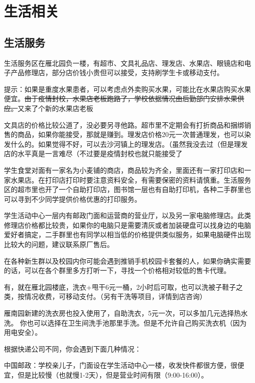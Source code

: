 \section{生活相关}

\subsection*{生活服务}


生活服务区在雁北园负一楼，有超市、文具礼品店、理发店、水果店、眼镜店和电子产品修理店，部分店价钱小贵但可以接受，支持刷学生卡或移动支付。

提示：如果是重度水果患者，可以考虑点外卖购买水果，可能比在水果店购买水果便宜。\sout{由于疫情封校，水果店老板跑路了，学校依据情况由后勤部门安排水果供应。}又来了个新的水果店老板

文具店的价格比较公道了，没必要另寻他路。超市里不定期会有打折商品和捆绑销售的商品，如果你能接受，那就是赚到。理发店价格20元一次普通理发，也可以染发什么的。如果觉得不好，可以去沙河镇上的理发店。（虽然我没去过（但是理发店的水平真是一言难尽（不过要是疫情封校也就只能接受了

学生食堂对面有一家名为小麦铺的商店，商品较为齐全，里面还有一家打印店和一家水果店。在打印店打印时要注意资料安全，有需要保密的资料请慎重。生活服务区的超市里也开了一个自助打印店，图书馆一层也有自助打印机，各种二手群里也可以寻到不少同学提供价格优惠的打印服务。

学生活动中心一层内有邮政门面和运营商的营业厅，以及另一家电脑修理店。此类修理店价格都比较贵，如果你的电脑只是需要清灰或者加装硬盘可以找身边的电脑爱好者搞定，二手群里也有同学以相当低的价格提供类似服务，如果电脑硬件出现比较大的问题，建议联系原厂售后。

在各种新生群以及校园内你可能会遇到推销手机校园卡套餐的人，如果你确实需要的话，可以在各个群里多方打听一下，寻找一个价格相对较低的售卡代理。


有，就在雁北园楼底，洗衣+甩干6元一桶，2小时后可取，也可以洗被子鞋子之类，按情况收费，可移动支付。（另有干洗等项目，详情到店咨询）

雁南园新建的洗衣房也投入使用了，自助洗衣，5元一次，可以多加几元选择热水洗。
你也可以选择在卫生间洗手池那里手洗。但是不允许自己购买洗衣机（因为用电安全）。


根据快递公司不同，你会遇到下面几种情况：

中国邮政：学校亲儿子，门面设在学生活动中心一楼，收发快件都很方便，很便宜，但是比较慢（也就慢1-2天），但是营业时间有限（9:00-16:00）。

